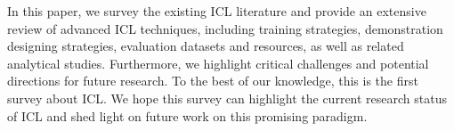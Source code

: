 In this paper, we survey the existing ICL literature and provide an extensive review of advanced ICL techniques, including training strategies, demonstration designing strategies, evaluation datasets and resources, as well as related analytical studies. Furthermore, we highlight critical challenges and potential directions for future research. To the best of our knowledge, this is the first survey about ICL. We hope this survey can highlight the current research status of ICL and shed light on future work on this promising paradigm. 